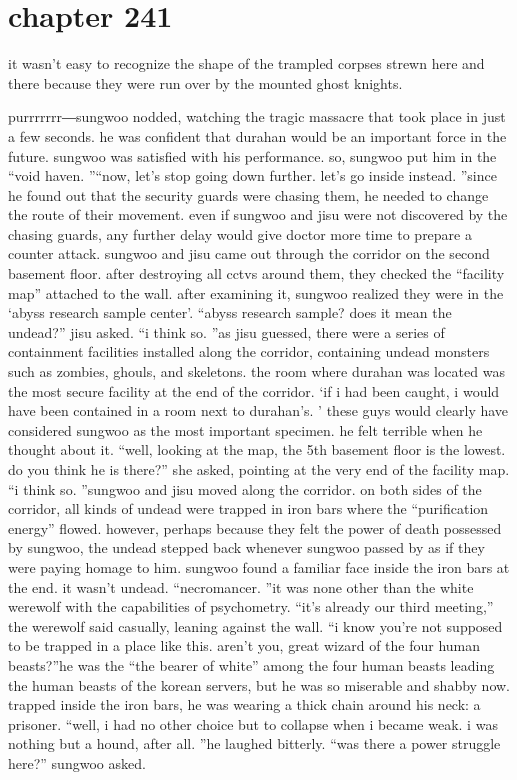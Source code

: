 \section{chapter 241}

                            it wasn’t easy to recognize the shape of the trampled corpses strewn here and there because they were run over by the mounted ghost knights.





purrrrrrr―sungwoo nodded, watching the tragic massacre that took place in just a few seconds.
he was confident that durahan would be an important force in the future.
sungwoo was satisfied with his performance.
 so, sungwoo put him in the “void haven.
”“now, let’s stop going down further.
 let’s go inside instead.
”since he found out that the security guards were chasing them, he needed to change the route of their movement.
 even if sungwoo and jisu were not discovered by the chasing guards, any further delay would give doctor more time to prepare a counter attack.
sungwoo and jisu came out through the corridor on the second basement floor.
after destroying all cctvs around them, they checked the “facility map” attached to the wall.
after examining it, sungwoo realized they were in the ‘abyss research sample center’.
“abyss research sample? does it mean the undead?” jisu asked.
“i think so.
”as jisu guessed, there were a series of containment facilities installed along the corridor, containing undead monsters such as zombies, ghouls, and skeletons.
the room where durahan was located was the most secure facility at the end of the corridor.
‘if i had been caught, i would have been contained in a room next to durahan’s.
’
these guys would clearly have considered sungwoo as the most important specimen.
he felt terrible when he thought about it.
“well, looking at the map, the 5th basement floor is the lowest.
 do you think he is there?” she asked, pointing at the very end of the facility map.
“i think so.
”sungwoo and jisu moved along the corridor.
 on both sides of the corridor, all kinds of undead were trapped in iron bars where the “purification energy” flowed.
however, perhaps because they felt the power of death possessed by sungwoo, the undead stepped back whenever sungwoo passed by as if they were paying homage to him.
sungwoo found a familiar face inside the iron bars at the end.
 it wasn’t undead.
“necromancer.
”it was none other than the white werewolf with the capabilities of psychometry.
“it’s already our third meeting,” the werewolf said casually, leaning against the wall.
“i know you’re not supposed to be trapped in a place like this.
 aren’t you, great wizard of the four human beasts?”he was the “the bearer of white” among the four human beasts leading the human beasts of the korean servers, but he was so miserable and shabby now.
 trapped inside the iron bars, he was wearing a thick chain around his neck: a prisoner.
“well, i had no other choice but to collapse when i became weak.
 i was nothing but a hound, after all.
”he laughed bitterly.
“was there a power struggle here?” sungwoo asked.

